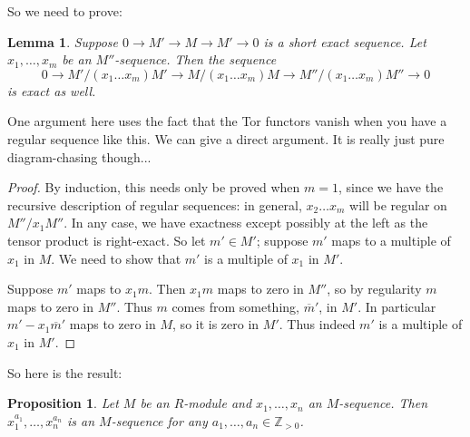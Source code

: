 \documentclass{article}
\newtheorem{lemma}{Lemma}
\newtheorem{proposition}{Proposition}
\begin{document}
So we need to prove:
\begin{lemma} 
Suppose $0 \to M' \to M \to M' \to 0$ is a short exact sequence. Let $x_1,
\dots, x_m$ be an $M''$-sequence. Then the sequence
\[ 0 \to M'/(x_1 \dots x_m)M' \to M/(x_1 \dots x_m)M \to   M''/(x_1 \dots
x_m)M'' \to 0\]
is exact as well.
\end{lemma} 
One argument here uses the fact that the Tor functors vanish when you have a
regular sequence like this. We can give a direct argument. It is really just
pure diagram-chasing though...
\begin{proof} 
By induction, this needs only be proved when $m=1$, since we have the recursive
description of regular sequences: in general, $x_2 \dots x_m$ will be regular
on $M''/x_1 M''$. 
In any case, we have exactness except possibly at the left as the tensor
product is right-exact. So let $m' \in M'$; suppose $m'$ maps to a multiple of
$x_1$ in $M$. We need to show that $m'$ is a multiple of $x_1$ in $M'$. 

Suppose $m'$ maps to $x_1 m$. Then $x_1m$ maps to zero in $M''$, so by regularity $m$
maps to zero in $M''$. Thus $m$ comes from something, $\overline{m}'$, in $M'$. In particular
$m' - x_1 \overline{m}'$ maps to zero in $M$, so it is zero in $M'$. Thus
indeed $m'$ is a multiple of $x_1$ in $M'$.
\end{proof} 
So here is the result:

\begin{proposition} 
Let $M$ be an $R$-module and $x_1, \dots, x_n$ an $M$-sequence. Then $x_1^{a_1}
,\dots, x_n^{a_n}$ is an $M$-sequence for any $a_1, \dots, a_n \in
\mathbb{Z}_{>0}$.
\end{proposition} 
\end{document}
